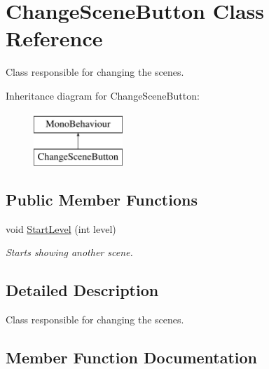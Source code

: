 \hypertarget{class_change_scene_button}{}\section{Change\+Scene\+Button Class Reference}
\label{class_change_scene_button}


Class responsible for changing the scenes.  


Inheritance diagram for Change\+Scene\+Button\+:\begin{figure}[H]
\begin{center}
\leavevmode
\includegraphics[height=2.000000cm]{class_change_scene_button}
\end{center}
\end{figure}
\subsection*{Public Member Functions}
\begin{DoxyCompactItemize}
\item 
void \mbox{\hyperlink{class_change_scene_button_a68b0f6974bd17f340643158594100af5}{Start\+Level}} (int level)
\begin{DoxyCompactList}\small\item\em Starts showing another scene. \end{DoxyCompactList}\end{DoxyCompactItemize}


\subsection{Detailed Description}
Class responsible for changing the scenes. 



\subsection{Member Function Documentation}
\mbox{\label{class_change_scene_button_a68b0f6974bd17f340643158594100af5}} 
